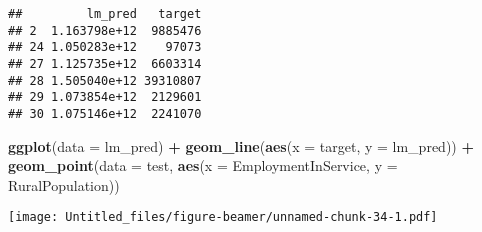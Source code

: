 \documentclass[ignorenonframetext,]{beamer}
\newenvironment{Shaded}{\begin{snugshade}}{\end{snugshade}}
\newcommand{\DataTypeTok}[1]{\textcolor[rgb]{0.13,0.29,0.53}{#1}}
\newcommand{\KeywordTok}[1]{\textcolor[rgb]{0.13,0.29,0.53}{\textbf{#1}}}
\newcommand{\NormalTok}[1]{#1}
\newcommand{\OperatorTok}[1]{\textcolor[rgb]{0.81,0.36,0.00}{\textbf{#1}}}
\newcommand{\StringTok}[1]{\textcolor[rgb]{0.31,0.60,0.02}{#1}}
\begin{document}
\begin{frame}[fragile]
\begin{Shaded}
\end{Shaded}

\begin{verbatim}
##         lm_pred   target
## 2  1.163798e+12  9885476
## 24 1.050283e+12    97073
## 27 1.125735e+12  6603314
## 28 1.505040e+12 39310807
## 29 1.073854e+12  2129601
## 30 1.075146e+12  2241070
\end{verbatim}

\begin{Shaded}
\begin{Highlighting}[]
\KeywordTok{ggplot}\NormalTok{(}\DataTypeTok{data =}\NormalTok{ lm_pred) }\OperatorTok{+}
\StringTok{  }\KeywordTok{geom_line}\NormalTok{(}\KeywordTok{aes}\NormalTok{(}\DataTypeTok{x =}\NormalTok{ target, }\DataTypeTok{y =}\NormalTok{ lm_pred)) }\OperatorTok{+}\StringTok{ }
\StringTok{  }\KeywordTok{geom_point}\NormalTok{(}\DataTypeTok{data =}\NormalTok{ test, }\KeywordTok{aes}\NormalTok{(}\DataTypeTok{x =}\NormalTok{ EmploymentInService, }\DataTypeTok{y =}\NormalTok{ RuralPopulation))}
\end{Highlighting}
\end{Shaded}

\texttt{[image: Untitled\_files/figure-beamer/unnamed-chunk-34-1.pdf]}

\end{frame}
\end{document}
